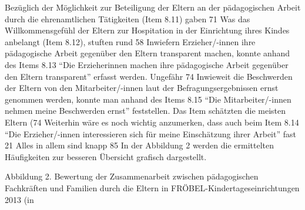 \documentclass[12pt,a4paper]{article}
\begin{document}
	Bezüglich der Möglichkeit zur Beteiligung der Eltern an der pädagogischen Arbeit durch die ehrenamtlichen Tätigkeiten (Item 8.11) gaben 71%
	Was das Willkommensgefühl der Eltern zur Hospitation in der Einrichtung ihres Kindes anbelangt (Item 8.12), stuften rund 58%
	Inwiefern Erzieher/-innen ihre pädagogische Arbeit gegenüber den Eltern transparent machen, konnte anhand des Items 8.13 "`Die Erzieherinnen machen ihre pädagogische Arbeit gegenüber den Eltern transparent"' erfasst werden. Ungefähr 74%
	Inwieweit die Beschwerden der Eltern von den Mitarbeiter/-innen laut der Befragungsergebnissen ernst genommen werden, konnte man anhand des Items 8.15 "`Die Mitarbeiter/-innen nehmen meine Beschwerden ernst"' feststellen. Das Item schätzten die meisten Eltern (74%
	Weiterhin wäre es noch wichtig anzumerken, dass auch beim Item 8.14 "`Die Erzieher/-innen interessieren sich für meine Einschätzung ihrer Arbeit"' fast 21%
 	Alles in allem sind knapp 85%
	In der Abbildung 2 werden die ermittelten Häufigkeiten zur besseren Übersicht  grafisch dargestellt.

Abbildung 2. Bewertung der Zusammenarbeit zwischen pädagogischen Fachkräften und Familien durch die Eltern in FRÖBEL-Kindertageseinrichtungen 2013 (in %
\end{document}
